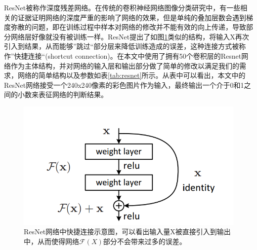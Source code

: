 ResNet被称作深度残差网络。在传统的卷积神经网络图像分类研究中，有一些相关的证据证明网络的深度严重的影响了网络的效果，但是单纯的叠加层数会遇到梯度弥散的问题，即在训练过程中样本对网络的修改并不能有效的向上传递，导致部分网络层好像就没有被训练一样。ResNet提出了如图\ref{fig:resnet}类似的结构，将输入X再次引入到结果，从而能够”跳过“部分层来降低训练造成的误差，这种连接方式被称作”快捷连接“(shortcut connection)。在本文中使用了拥有50个卷积层的Resnet网络作为主体结构，并对网络的输入层和输出部分做了简单的修改以满足我们的需求，网络的简单结构以及参数如表\ref{tab:resnet}所示。从表中可以看出，本文中的ResNet网络接受一个240x240像素的彩色图片作为输入，最终输出一个介于0和1之间的小数来表征网络的判断结果。

\begin{figure}
    \centering
    \includegraphics[width=0.6\columnwidth]{pic/resnet.png}
    \caption{ResNet网络中快捷连接示意图，可以看出输入量X被直接引入到输出中，从而使得网络$\mathcal{F}(X)$部分不会带来过多的误差。}
    \label{fig:resnet}
\end{figure}

